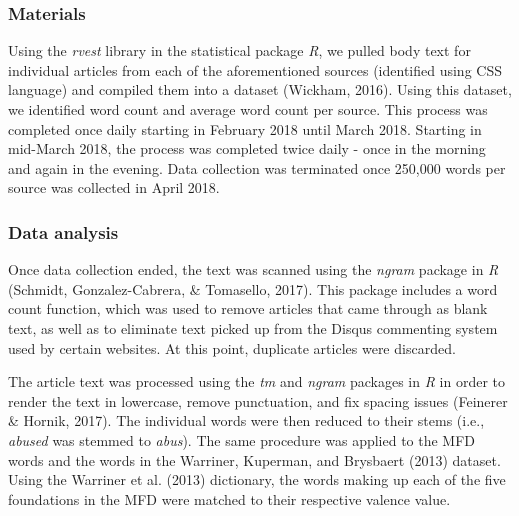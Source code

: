 \documentclass[
  man,floatsintext]{apa6}
\begin{document}
\subsubsection{Materials}\label{materials}

Using the \emph{rvest} library in the statistical package \emph{R}, we pulled body
text for individual articles from each of the aforementioned sources
(identified using CSS language) and compiled them into a dataset
(Wickham, 2016). Using this dataset, we identified word count and average
word count per source. This process was completed once daily starting in
February 2018 until March 2018. Starting in mid-March 2018, the process
was completed twice daily - once in the morning and again in the
evening. Data collection was terminated once 250,000 words per source
was collected in April 2018.

\subsubsection{Data analysis}\label{data-analysis}

Once data collection ended, the text was scanned using the \emph{ngram}
package in \emph{R} (Schmidt, Gonzalez-Cabrera, \& Tomasello, 2017). This package includes a word count
function, which was used to remove articles that came through as blank
text, as well as to eliminate text picked up from the Disqus commenting
system used by certain websites. At this point, duplicate articles were
discarded.

The article text was processed using the \emph{tm} and \emph{ngram} packages in
\emph{R} in order to render the text in lowercase, remove punctuation, and
fix spacing issues (Feinerer \& Hornik, 2017). The individual words were then
reduced to their stems (i.e., \emph{abused} was stemmed to \emph{abus}). The same
procedure was applied to the MFD words and the words in the
Warriner, Kuperman, and Brysbaert (2013) dataset. Using the Warriner et al. (2013) dictionary, the words
making up each of the five foundations in the MFD were matched to their
respective valence value.
\end{document}
